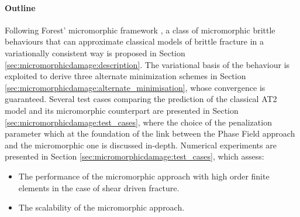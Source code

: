 \paragraph{Outline}

Following Forest' micromorphic framework
\cite{forest_micromorphic_2009, forest_nonlinear_2016}, a class of micromorphic
brittle behaviours that can approximate classical models of brittle
fracture in a variationally consistent way is proposed in
Section \ref{sec:micromorphicdamage:description}.
The variational basis of the behaviour is exploited to derive three alternate
minimization schemes in Section
\ref{sec:micromorphicdamage:alternate_minimisation}, whose convergence is guaranteed.
%
%
%
Several test cases comparing the prediction of the classical AT2 model
and its micromorphic counterpart are presented in Section
\ref{sec:micromorphicdamage:test_cases}, where
the choice of the penalization
parameter which at the foundation of the link between the Phase Field approach and the 
micromorphic one is discussed in-depth.
%
%
%
Numerical experiments are presented in Section
\ref{sec:micromorphicdamage:test_cases}, which assess:
%
%
%
\begin{itemize}
    \item The performance of the micromorphic approach with high order finite
    elements in the case of shear driven fracture.
    \item The scalability of the micromorphic approach.
\end{itemize}